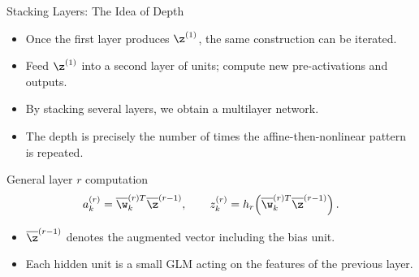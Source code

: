 \begin{frame}{Stacking Layers: The Idea of Depth}
  \begin{itemize}
    \item Once the first layer produces $\z^{(1)}$, the \alert{same construction can be iterated}.
    \item Feed $\z^{(1)}$ into a second layer of units; compute new pre-activations and outputs.
    \item By stacking several layers, we obtain a \alert{multilayer network}.
    \item The depth is precisely the number of times the affine-then-nonlinear pattern is repeated.
  \end{itemize}
  \begin{block}{General layer $r$ computation}
    \[
      a_k^{(r)} = \overline{\w}_k^{(r)T}\overline{\z}^{(r-1)}, \qquad
      z_k^{(r)} = h_r\!\left(\overline{\w}_k^{(r)T}\overline{\z}^{(r-1)}\right).
    \]
  \end{block}
  \begin{itemize}
    \item $\overline{\z}^{(r-1)}$ denotes the augmented vector including the bias unit.
    \item Each hidden unit is a small GLM acting on the \alert{features of the previous layer}.
  \end{itemize}
\end{frame}

